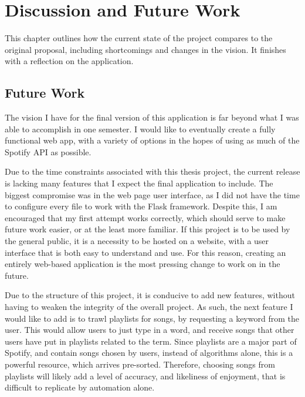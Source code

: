 %
%
%

\chapter{Discussion and Future Work}\label{ch:conclusion}
This chapter outlines how the current state of the project compares to the original
proposal, including shortcomings and changes in the vision. It finishes with a reflection
on the application.

\section{Future Work}
The vision I have for the final version of this application is far beyond what
I was able to accomplish in one semester. I would like to eventually create a
fully functional web app, with a variety of options in the hopes of using as
much of the Spotify API as possible.

Due to the time constraints associated with this thesis project, the current
release is lacking many features that I expect the final application to include.
The biggest compromise was in the web page user interface, as I did not have the
time to configure every file to work with the Flask framework. Despite this, I am
encouraged that my first attempt works correctly, which should serve to make
future work easier, or at the least more familiar. If this project is to be used
by the general public, it is a necessity to be hosted on a website, with a user
interface that is both easy to understand and use. For this reason, creating an
entirely web-based application is the most pressing change to work on in the future.

Due to the structure of this project, it is conducive to add new features, without
having to weaken the integrity of the overall project. As such, the next feature
I would like to add is to trawl playlists for songs, by requesting a keyword from
the user. This would allow users to just type in a word, and receive songs that
other users have put in playlists related to the term. Since playlists are a
major part of Spotify, and contain songs chosen by users, instead of algorithms
alone, this is a powerful resource, which arrives pre-sorted. Therefore, choosing
songs from playlists will likely add a level of accuracy, and likeliness of
enjoyment, that is difficult to replicate by automation alone.

